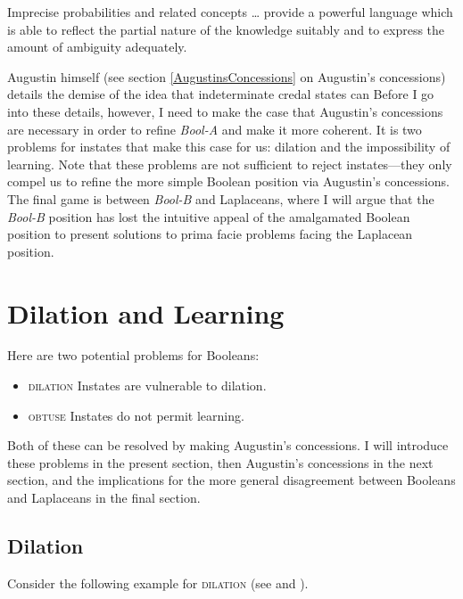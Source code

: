 \documentclass[11pt]{article}
\newcommand{\anderson}[0]{\textit{Bool-A}}
\newcommand{\augustin}[0]{\textit{Bool-B}}
\begin{document}
\begin{quotex}
  Imprecise probabilities and related concepts {\ldots} provide a
  powerful language which is able to reflect the partial nature of the
  knowledge suitably and to express the amount of ambiguity
  adequately. 
\end{quotex}

Augustin himself (see section \ref{AugustinsConcessions} on Augustin's
concessions) details the demise of the idea that indeterminate credal
states can  Before
I go into these details, however, I need to make the case that
Augustin's concessions are necessary in order to refine {\anderson}
and make it more coherent. It is two problems for instates that make
this case for us: dilation and the impossibility of learning. Note
that these problems are not sufficient to reject instates---they only
compel us to refine the more simple Boolean position via Augustin's
concessions. The final game is between {\augustin} and Laplaceans,
where I will argue that the {\augustin} position has lost the
intuitive appeal of the amalgamated Boolean position to present
solutions to prima facie problems facing the Laplacean position.

\section{Dilation and Learning}
\label{DilationLearningAndEntropy}

Here are two potential problems for Booleans:

\begin{itemize}
\item \textsc{dilation} Instates are vulnerable to dilation.
\item \textsc{obtuse} Instates do not permit learning.
\end{itemize}

Both of these can be resolved by making Augustin's concessions. I will
introduce these problems in the present section, then Augustin's
concessions in the next section, and the implications for the more
general disagreement between Booleans and Laplaceans in the final
section.

\subsection{Dilation}
\label{dilation}

Consider the following example for \textsc{dilation} (see
 and ).
\end{document}
